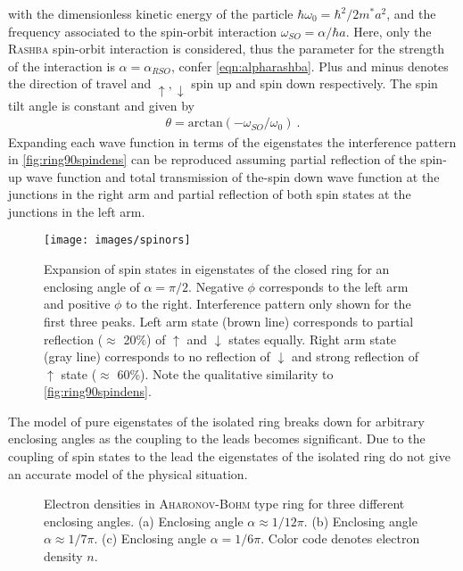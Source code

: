 with the dimensionless kinetic energy of the particle $\hbar\omega_0=\hbar^2/2m^*a^2$, and the frequency associated to the spin-orbit interaction $\omega_{SO} = \alpha/\hbar a$. Here, only the \textsc{Rashba} spin-orbit interaction is considered, thus the parameter for the strength of the interaction is $\alpha = \alpha_{RSO}$, confer \cref{eqn:alpharashba}. Plus and minus denotes the direction of travel and $\uparrow,\downarrow$ spin up and spin down respectively. The spin tilt angle is constant and given by
\begin{align}
\theta = \text{arctan}(-\omega_{SO}/\omega_0)\ .
\end{align}
Expanding each wave function in terms of the eigenstates the interference pattern in \cref{fig:ring90spindens} can be reproduced assuming partial reflection of the spin-up wave function and total transmission of the-spin down wave function at the junctions in the right arm and partial reflection of both spin states at the junctions in the left arm.
\begin{figure}[!h]
  \centering
  \texttt{[image: images/spinors]}
  \caption{Expansion of spin states in eigenstates of the closed ring for an enclosing angle of $\alpha = \pi/2$. Negative $\phi$ corresponds to the left arm and positive $\phi$ to the right. Interference pattern only shown for the first three peaks. Left arm state (brown line) corresponds to partial reflection ($\approx$ 20\%) of $\uparrow$ and $\downarrow$ states equally. Right arm state (gray line) corresponds to no reflection of $\downarrow$ and strong reflection of $\uparrow$ state ($\approx$ 60\%). Note the qualitative similarity to \cref{fig:ring90spindens}.}
\end{figure}
The model of pure eigenstates of the isolated ring breaks down for arbitrary enclosing angles as the coupling to the leads becomes significant. Due to the coupling of spin states to the lead the eigenstates of the isolated ring do not give an accurate model of the physical situation.\par
\begin{figure}[h!]
  \caption{Electron densities in \textsc{Aharonov-Bohm} type ring for three different enclosing angles. (a) Enclosing angle $\alpha\approx 1/12 \pi$. (b) Enclosing angle $\alpha\approx 1/7\pi$. (c) Enclosing angle $\alpha=1/6\pi$. Color code denotes electron density $n$.} 
\end{figure}
